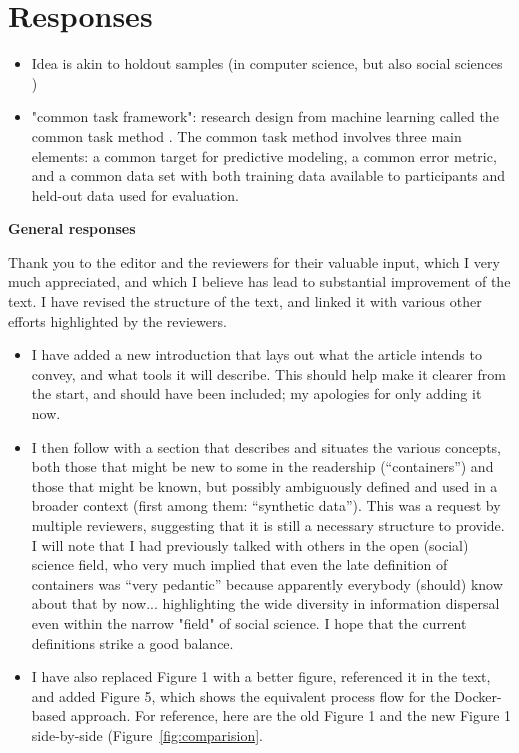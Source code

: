 \newpage
\section*{Responses}

\begin{itemize}

\item Idea is akin to holdout samples (in computer science, but also social sciences \citep{liu_successes_2019}) 
\item "common task framework": research design from machine learning called the common task method \citep{donoho_50_2017,liberman_obituary_2010}. The common task method involves three main elements: a common target for predictive modeling, a common error metric, and a common data set with both training data available to participants and held-out data used for evaluation. \citep{liu_successes_2019}

\end{itemize}

\textbf{General responses}

\begin{response}
    Thank you to the editor and the reviewers for their valuable input, which I very much appreciated, and which I believe has lead to substantial improvement of the text. I have revised the structure of the text, and linked it with various other efforts highlighted by the reviewers. 

    \begin{itemize}
        \item I have added a new introduction that lays out what the article intends to convey, and what tools it will describe. This should help make it clearer from the start, and should have been included; my apologies for only adding it now.
        \item I then follow with a section that describes and situates the various concepts, both those that might be new to some in the readership (``containers'') and those that might be known, but possibly ambiguously defined and used in a broader context (first among them: ``synthetic data''). This was a request by multiple reviewers, suggesting that it is still a necessary structure to provide. I will note that I had previously talked with others in the open (social) science field, who very much implied that even the late definition of containers was ``very pedantic'' because apparently everybody (should) know about that by now... highlighting the wide diversity in information dispersal even within the narrow "field" of social science. I hope that the current definitions strike a good balance.
        \item I have also replaced Figure 1 with a better figure, referenced it in the text, and added Figure 5, which shows the equivalent process flow for the Docker-based approach. For reference, here are the old Figure 1 and the new Figure 1 side-by-side (Figure~\ref{fig:comparision}.
    \end{itemize}
\end{response}

